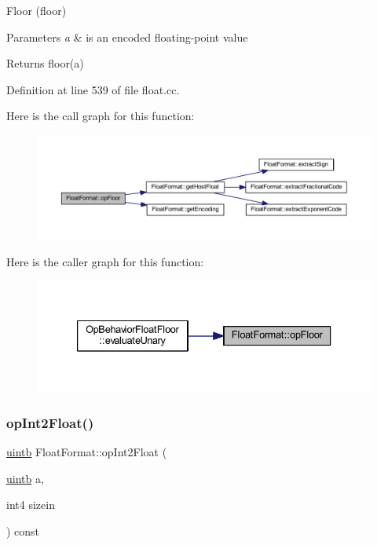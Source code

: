 Floor (floor) 


\begin{DoxyParams}{Parameters}
{\em a} & is an encoded floating-\/point value \\
\hline
\end{DoxyParams}
\begin{DoxyReturn}{Returns}
floor(a) 
\end{DoxyReturn}


Definition at line 539 of file float.\+cc.

Here is the call graph for this function\+:
\nopagebreak
\begin{figure}[H]
\begin{center}
\leavevmode
\includegraphics[width=350pt]{class_float_format_ad2e38aad3a27346e0eb55aedcbf531cd_cgraph}
\end{center}
\end{figure}
Here is the caller graph for this function\+:
\nopagebreak
\begin{figure}[H]
\begin{center}
\leavevmode
\includegraphics[width=333pt]{class_float_format_ad2e38aad3a27346e0eb55aedcbf531cd_icgraph}
\end{center}
\end{figure}
\mbox{\label{class_float_format_a610b9f8efe3b41368250940184691156}} 
\subsubsection{\texorpdfstring{opInt2Float()}{opInt2Float()}}
{\footnotesize\ttfamily \mbox{\hyperlink{types_8h_a2db313c5d32a12b01d26ac9b3bca178f}{uintb}} Float\+Format\+::op\+Int2\+Float (\begin{DoxyParamCaption}\item[{\mbox{\hyperlink{types_8h_a2db313c5d32a12b01d26ac9b3bca178f}{uintb}}}]{a,  }\item[{int4}]{sizein }\end{DoxyParamCaption}) const}



